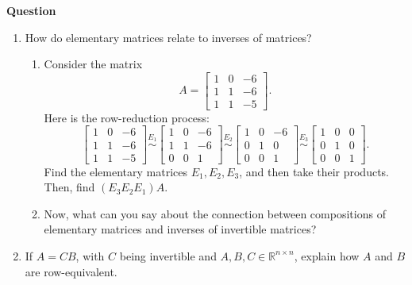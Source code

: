 \documentclass[10pt, titlepage]{article}
\newcounter{question}
\newenvironment{newquestion}
{
	\noindent\textbf{Question \thequestion}
}
{
\stepcounter{question}
\par
}
\begin{document}
\begin{newquestion}
\begin{enumerate}
		\item How do elementary matrices relate to inverses of matrices?
			\begin{enumerate}
				\item Consider the matrix \[A = \begin{bmatrix}1 & 0 & -6 \\ 1 & 1 & -6 \\ 1 & 1 & -5\end{bmatrix}.\] Here is the row-reduction process:
					\[\begin{bmatrix}1 & 0 & -6 \\ 1 & 1 & -6 \\ 1 & 1 & -5\end{bmatrix} \stackrel{E_1}{\sim} \begin{bmatrix}1 & 0 & -6 \\ 1 & 1 & -6 \\ 0 & 0 & 1\end{bmatrix} \stackrel{E_2}{\sim} \begin{bmatrix}1 & 0 & -6 \\ 0 & 1 & 0 \\ 0 & 0 & 1\end{bmatrix} \stackrel{E_3}{\sim} \begin{bmatrix}1 & 0 & 0 \\ 0 & 1 & 0 \\ 0 & 0 & 1\end{bmatrix}.\] Find  the elementary matrices \(E_1, E_2, E_3\), and then take their products. Then, find \((E_3E_2E_1)A\).

				\item Now, what can you say about the connection between compositions of elementary matrices and inverses of invertible matrices?
			\end{enumerate}
		
		\item[\textit{Extra}] If \(A = CB\), with \(C\) being invertible and \(A, B, C \in \mathbb{R}^{n \times n}\), explain how \(A\) and \(B\) are 
					     row-equivalent.
	\end{enumerate}
\end{newquestion}


\end{document}
